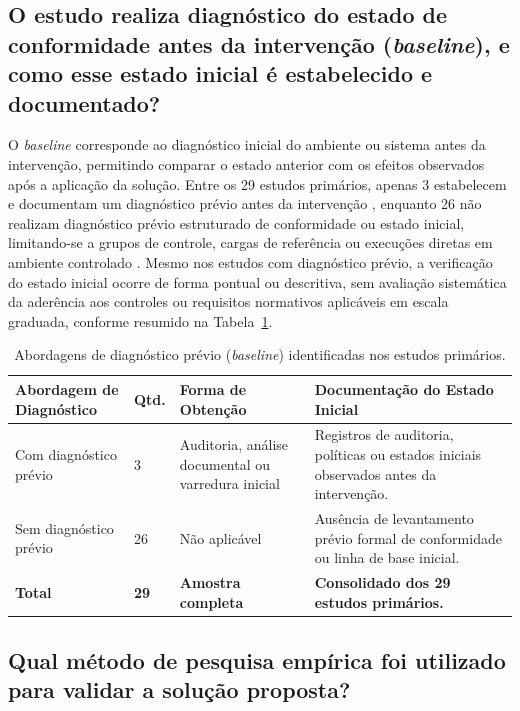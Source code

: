 \subsection{O estudo realiza diagnóstico do estado de conformidade antes da intervenção (\textit{baseline}), e como esse estado inicial é estabelecido e documentado?}
\label{subsec:rsl_qs09}

O \textit{baseline} corresponde ao diagnóstico inicial do ambiente ou sistema antes da intervenção, permitindo comparar o estado anterior com os efeitos observados após a aplicação da solução. Entre os 29 estudos primários, apenas 3 estabelecem e documentam um diagnóstico prévio antes da intervenção \cite{acosta2025,enaw2018,torkura2021}, enquanto 26 não realizam diagnóstico prévio estruturado de conformidade ou estado inicial, limitando-se a grupos de controle, cargas de referência ou execuções diretas em ambiente controlado \cite{jin2025,bungei2026,shao2026a,velasquez2025}. Mesmo nos estudos com diagnóstico prévio, a verificação do estado inicial ocorre de forma pontual ou descritiva, sem avaliação sistemática da aderência aos controles ou requisitos normativos aplicáveis em escala graduada, conforme resumido na Tabela~\ref{tab:rsl_qs09}.

\begin{table}[!htbp]
    \centering
    \caption{Abordagens de diagnóstico prévio (\textit{baseline}) identificadas nos estudos primários.}
    \label{tab:rsl_qs09}
    \footnotesize
    \begin{tabular}{p{3.4cm}p{1.7cm}p{3.0cm}p{5.7cm}}
        \hline
        \textbf{Abordagem de Diagnóstico} & \textbf{Qtd.} & \textbf{Forma de Obtenção} & \textbf{Documentação do Estado Inicial} \\ \hline
        Com diagnóstico prévio & 3 & Auditoria, análise documental ou varredura inicial & Registros de auditoria, políticas ou estados iniciais observados antes da intervenção. \\ \hline
        Sem diagnóstico prévio & 26 & Não aplicável & Ausência de levantamento prévio formal de conformidade ou linha de base inicial. \\ \hline
        \textbf{Total} & \textbf{29} & \textbf{Amostra completa} & \textbf{Consolidado dos 29 estudos primários.} \\ \hline
    \end{tabular}
\end{table}
\FloatBarrier

\subsection{Qual método de pesquisa empírica foi utilizado para validar a solução proposta?}
\label{subsec:rsl_qs10}


